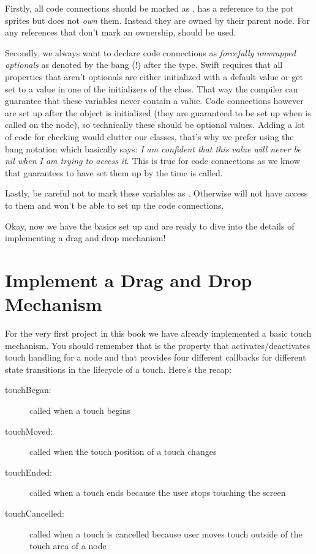Firstly, all code connections should be marked as .
 has a reference to the pot sprites but does not
\textit{own} them. Instead they are owned by their parent node. For any
references that don't mark an ownership,  should be used. 

Secondly, we always want to declare code connections as \textit{forcefully
unwrapped optionals} as denoted by the bang (!) after the type. Swift
requires that all properties that aren't optionals are either
initialized with a default value or get set to a value in one of the
initializers of the class. That way the compiler can guarantee that these
variables never contain a  value. Code connections however are
set up after the object is initialized (they are guaranteed to be set up
when  is called on the node), so technically these
should be optional values. Adding a lot of code for  checking
would clutter our classes, that's why we prefer using the bang notation which
basically says: \textit{I am confident that this value will never be nil when I
am trying to access it}. This is true for code connections as we know that
\cocos{} guarantees to have set them up by the time 
is called.

Lastly, be careful not to mark these variables as .
Otherwise \cocos{} will not have access to them and won't be able to set up the
code connections.

Okay, now we have the basics set up and are ready to dive into the details of
implementing a drag and drop mechanism!

\section{Implement a Drag and Drop Mechanism}
For the very first project in this book we have already implemented a basic
touch mechanism. You should remember that  is
the property that activates/deactivates touch handling for a node and that
\cocos{} provides four different callbacks for different state transitions in
the lifecycle of a touch. Here's the recap:

\begin{description}
\item[touchBegan:] called when a touch begins
\item[touchMoved:] called when the touch position of a touch changes
\item[touchEnded:] called when a touch ends because the user stops touching the
screen
\item[touchCancelled:] called when a touch is cancelled because user moves touch
outside of the touch area of a node
\end{description}

